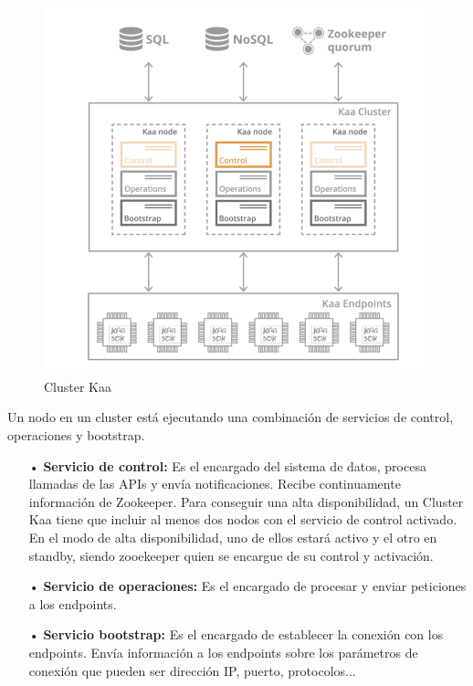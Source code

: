 \documentclass[12pt, twoside]{book}
\begin{document}
\begin{figure}[H]
\centering
\includegraphics[scale=0.6]{images/arquitectura_kaa}
\caption{Cluster Kaa}\label{L501}
\end{figure}
Un nodo en un cluster está ejecutando una combinación de servicios de control, operaciones y bootstrap.
\begin{itemize}
\item[•] \textbf{Servicio de control: }Es el encargado del sistema de datos, procesa llamadas de las APIs y envía notificaciones. Recibe continuamente información de Zookeeper. Para conseguir una alta disponibilidad, un Cluster Kaa tiene que incluir al menos dos nodos con el servicio de control activado. En el modo de alta disponibilidad, uno de ellos estará activo y el otro en standby, siendo zooekeeper quien se encargue de su control y activación.\\
\item[•]\textbf{Servicio de operaciones: }Es el encargado de procesar y enviar peticiones a los endpoints.\\
\item[•]\textbf{Servicio bootstrap: } Es el encargado de establecer la conexión con los endpoints. Envía información a los endpoints sobre los parámetros de conexión que pueden ser dirección IP, puerto, protocolos...
\end{itemize}
\end{document}

